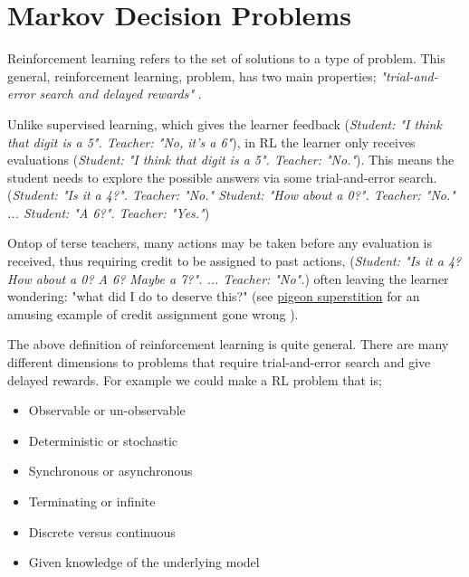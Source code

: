 \chapter{Markov Decision Problems}

Reinforcement learning refers to the set of solutions to a type of problem.
This general, reinforcement learning, problem, has two main properties;
\textit{"trial-and-error search and delayed rewards"} \cite{Sutton2018}.

Unlike supervised learning, which gives the learner feedback (\textit{Student: "I think that digit
is a 5". Teacher: "No, it's a 6"}), in RL the learner only receives evaluations (\textit{Student: "I think
that digit is a 5". Teacher: "No."}). This means the student needs to explore the possible answers via some trial-and-error search.
(\textit{Student: "Is it a 4?". Teacher: "No." Student: "How about a 0?". Teacher: "No." ... Student: "A 6?". Teacher: "Yes."})

Ontop of terse teachers, many actions may be taken before any evaluation is received, thus requiring credit to be assigned to past actions,
(\textit{Student: "Is it a 4? How about a 0? A 6? Maybe a 7?". ... Teacher: "No".})
often leaving the learner wondering: "what did I do to deserve this?" (see
\href{https://www.youtube.com/watch?v=Qv4H81gEGDQ}{pigeon superstition} for an amusing
example of credit assignment gone wrong \cite{Box1997}).


\vspace{5mm}

The above definition of reinforcement learning is quite general. There are many
different dimensions to problems that require trial-and-error search and give
delayed rewards. For example we could make a RL problem that is;

\begin{itemize}
\tightlist
\item
  Observable or un-observable
\item
  Deterministic or stochastic
\item
  Synchronous or asynchronous
\item
  Terminating or infinite
\item
  Discrete versus continuous
\item
  Given knowledge of the underlying model
\end{itemize}

